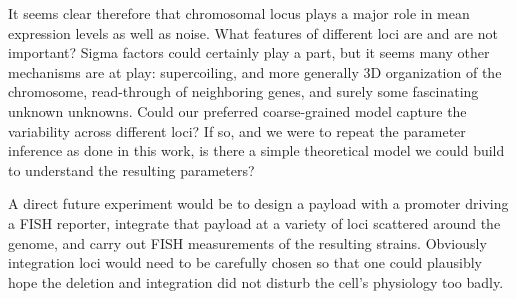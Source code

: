 It seems clear therefore that chromosomal locus plays a major
role in mean expression levels as well as noise. What features of
different loci are and are not important? Sigma factors could
certainly play a part, but it seems many other mechanisms are at
play: supercoiling, and more generally 3D organization of the
chromosome, read-through of neighboring genes, and surely some
fascinating unknown unknowns.
Could our preferred coarse-grained model capture the variability
across different loci? If so, and we were to repeat the parameter
inference as done in this work, is there a simple theoretical model
we could build to understand the resulting parameters?

A direct  future experiment would be
to design a payload with a promoter driving a FISH reporter,
integrate that payload at a variety of loci scattered around the genome,
and carry out FISH measurements of the resulting strains.
Obviously integration loci would need to be carefully chosen so
that one could plausibly hope the deletion and integration did
not disturb the cell's physiology too badly.